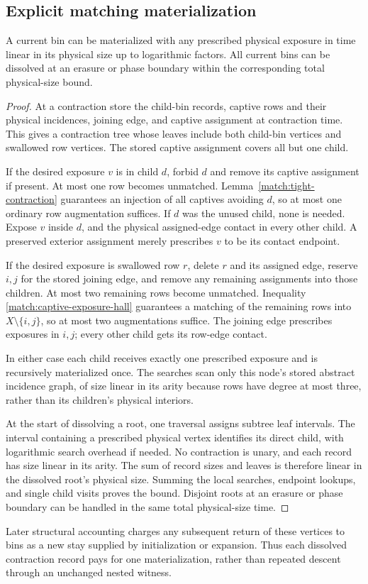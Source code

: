 \subsection{Explicit matching materialization}

\begin{lemma}
\label{match:materialization}
A current bin can be materialized with any prescribed physical
exposure in time linear in its physical size up to logarithmic
factors.  All current bins can be dissolved at an erasure or phase
boundary within the corresponding total physical-size bound.
\end{lemma}
\begin{proof}
At a contraction store the child-bin records, captive rows and
their physical incidences, joining edge, and captive assignment
at contraction time.  This gives a contraction tree whose leaves
include both child-bin vertices and swallowed row vertices.
The stored captive assignment covers all but one child.

If the desired exposure \(v\) is in child \(d\), forbid \(d\) and
remove its captive assignment if present.  At most one row becomes
unmatched.  Lemma~\ref{match:tight-contraction} guarantees an injection
of all captives avoiding \(d\), so at most one ordinary row
augmentation suffices.  If \(d\) was the unused child, none is
needed.  Expose \(v\) inside \(d\), and the physical assigned-edge
contact in every other child.  A preserved exterior assignment
merely prescribes \(v\) to be its contact endpoint.

If the desired exposure is swallowed row \(r\), delete \(r\) and
its assigned edge, reserve \(i,j\) for the stored joining edge,
and remove any remaining assignments into those children.
At most two remaining rows become unmatched.  Inequality
\eqref{match:captive-exposure-hall} guarantees a matching of the
remaining rows into \(X\setminus\{i,j\}\), so at most two
augmentations suffice.  The joining edge prescribes exposures
in \(i,j\); every other child gets its row-edge contact.

In either case each child receives exactly one prescribed exposure
and is recursively materialized once.  The searches scan only this
node's stored abstract incidence graph, of size linear in its arity
because rows have degree at most three, rather than its children's
physical interiors.

At the start of dissolving a root, one traversal assigns subtree
leaf intervals.  The interval containing a prescribed physical
vertex identifies its direct child, with logarithmic search overhead
if needed.  No contraction is unary, and each record has size linear
in its arity.  The sum of record sizes and leaves is therefore
linear in the dissolved root's physical size.  Summing the local
searches, endpoint lookups, and single child visits proves the bound.
Disjoint roots at an erasure or phase boundary can be handled in
the same total physical-size time.
\end{proof}

Later structural accounting charges any subsequent return of these
vertices to bins as a new stay supplied by initialization or expansion.
Thus each dissolved contraction record pays for one materialization,
rather than repeated descent through an unchanged nested witness.
